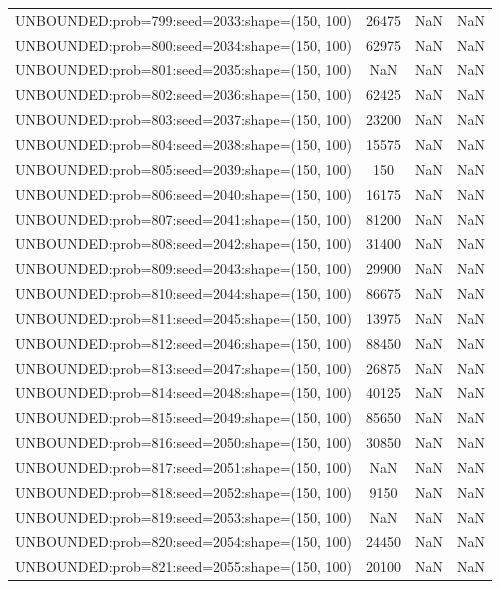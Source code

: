 \begin{longtable}{lccc}
UNBOUNDED:prob=799:seed=2033:shape=(150, 100) & 26475 &   NaN &    NaN \\
UNBOUNDED:prob=800:seed=2034:shape=(150, 100) & 62975 &   NaN &    NaN \\
UNBOUNDED:prob=801:seed=2035:shape=(150, 100) &   NaN &   NaN &    NaN \\
UNBOUNDED:prob=802:seed=2036:shape=(150, 100) & 62425 &   NaN &    NaN \\
UNBOUNDED:prob=803:seed=2037:shape=(150, 100) & 23200 &   NaN &    NaN \\
UNBOUNDED:prob=804:seed=2038:shape=(150, 100) & 15575 &   NaN &    NaN \\
UNBOUNDED:prob=805:seed=2039:shape=(150, 100) &   150 &   NaN &    NaN \\
UNBOUNDED:prob=806:seed=2040:shape=(150, 100) & 16175 &   NaN &    NaN \\
UNBOUNDED:prob=807:seed=2041:shape=(150, 100) & 81200 &   NaN &    NaN \\
UNBOUNDED:prob=808:seed=2042:shape=(150, 100) & 31400 &   NaN &    NaN \\
UNBOUNDED:prob=809:seed=2043:shape=(150, 100) & 29900 &   NaN &    NaN \\
UNBOUNDED:prob=810:seed=2044:shape=(150, 100) & 86675 &   NaN &    NaN \\
UNBOUNDED:prob=811:seed=2045:shape=(150, 100) & 13975 &   NaN &    NaN \\
UNBOUNDED:prob=812:seed=2046:shape=(150, 100) & 88450 &   NaN &    NaN \\
UNBOUNDED:prob=813:seed=2047:shape=(150, 100) & 26875 &   NaN &    NaN \\
UNBOUNDED:prob=814:seed=2048:shape=(150, 100) & 40125 &   NaN &    NaN \\
UNBOUNDED:prob=815:seed=2049:shape=(150, 100) & 85650 &   NaN &    NaN \\
UNBOUNDED:prob=816:seed=2050:shape=(150, 100) & 30850 &   NaN &    NaN \\
UNBOUNDED:prob=817:seed=2051:shape=(150, 100) &   NaN &   NaN &    NaN \\
UNBOUNDED:prob=818:seed=2052:shape=(150, 100) &  9150 &   NaN &    NaN \\
UNBOUNDED:prob=819:seed=2053:shape=(150, 100) &   NaN &   NaN &    NaN \\
UNBOUNDED:prob=820:seed=2054:shape=(150, 100) & 24450 &   NaN &    NaN \\
UNBOUNDED:prob=821:seed=2055:shape=(150, 100) & 20100 &   NaN &    NaN \\

\end{longtable}
